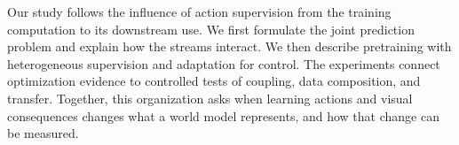 Our study follows the influence of action supervision from the training computation to its
downstream use. We first formulate the joint prediction problem and explain how the streams
interact. We then describe pretraining with heterogeneous supervision and adaptation for control.
The experiments connect optimization evidence to controlled tests of coupling, data composition, and
transfer. Together, this organization asks when learning actions and visual consequences changes
what a world model represents, and how that change can be measured.
